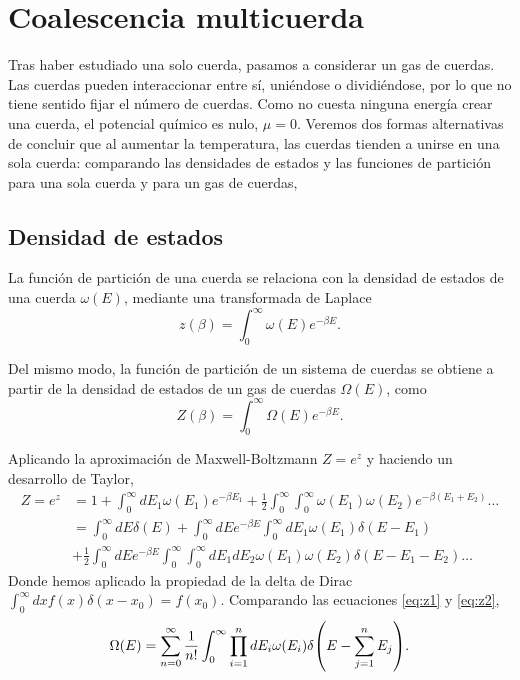 
\section{Coalescencia multicuerda}

Tras haber estudiado una solo cuerda, pasamos a considerar un gas de cuerdas.
Las cuerdas pueden interaccionar entre sí, uniéndose o dividiéndose, por lo que
no tiene sentido fijar el número de cuerdas. 
Como no cuesta ninguna energía crear una cuerda, el potencial químico es nulo, $\mu=0$.
Veremos dos formas alternativas de concluir que al aumentar la temperatura, las cuerdas
tienden a unirse en una sola cuerda:
comparando las densidades de estados y las funciones de partición para una sola 
cuerda y para un gas de cuerdas, 

\subsection{Densidad de estados}

La función de partición de una cuerda se relaciona con la densidad de estados de una cuerda $\omega(E)$, mediante
una transformada de Laplace
\begin{equation}
  z(\beta) = \int_0^\infty \omega(E)e^{-\beta E}.
\end{equation}

Del mismo modo, la función de partición de un sistema de cuerdas se obtiene a partir de la
densidad de estados de un gas de cuerdas $\Omega(E)$, como
\begin{equation}
  Z(\beta) = \int_0^\infty \Omega(E)e^{-\beta E}.
  \label{eq:z1}
\end{equation}

Aplicando la aproximación de Maxwell-Boltzmann $Z=e^z$ y haciendo un desarrollo de Taylor,
\begin{equation}
  \begin{aligned}
      Z = e^z&= 1+ \int_0^\infty dE_1\omega(E_1)e^{-\beta E_1} +\frac 1 2 \int_0^\infty \int_0^\infty
      \omega(E_1)\omega(E_2)e^{-\beta(E_1+E_2)}\dots \\
      &=\int_0^\infty dE \delta(E) + \int_0^\infty dE e^{-\beta E}\int_0^\infty  dE_1\omega(E_1)\delta(E-E_1)\\
      &+\frac 1 2\int_0^\infty dE e^{-\beta E} \int_0^\infty\int_0^\infty dE_1 dE_2 \omega(E_1)\omega(E_2) \delta(E-E_1-E_2)\dots
  \end{aligned}
  \label{eq:z2}
\end{equation}
Donde hemos aplicado la propiedad de la delta de Dirac $\int_0^\infty dx f(x)\delta(x-x_0) = f(x_0)$.
Comparando las ecuaciones \ref{eq:z1} y \ref{eq:z2},
\begin{equation}
  \Omega(E)=\sum_{n=0}^\infty \frac{1}{n!}\int_0^\infty \prod_{i=1}^n dE_i \omega(E_i)\delta\qty(E-\sum_{j=1}^n E_j).
\end{equation}

